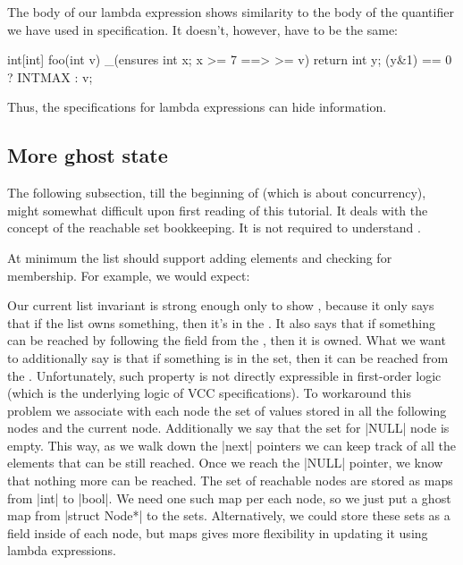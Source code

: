 \begin{note}
The body of our lambda expression shows similarity to the body
of the quantifier we have used in specification.
It doesn't, however, have to be the same:
\begin{VCC}
int[int] foo(int v)
  _(ensures \forall int x; x >= 7 ==> \result[x] >= v)
{
  return \lambda int y; (y&1) == 0 ? INTMAX : v;
}
\end{VCC}
Thus, the specifications for lambda expressions can hide information.
\end{note}


\subsection{More ghost state}

\begin{note}
The following subsection, till the beginning of  (which is
about concurrency), might somewhat difficult upon first reading of this
tutorial.
It deals with the concept of the reachable set bookkeeping.
It is not required to understand .
\end{note}

At minimum the list should support adding elements and checking
for membership. For example, we would expect:


\noindent
Our current list invariant is strong enough only to show
, because it only says
that if the list owns something, then it's in the .
It also says that if something can be reached by following
the  field from the , then it is owned.
What we want to additionally say is that if something is in the 
set, then it can be reached from the .
Unfortunately, such property is not directly expressible in first-order
logic (which is the underlying logic of VCC specifications).
To workaround this problem we associate with each node
the set of values stored in all the following nodes and
the current node.
Additionally we say that the set for \vcc|NULL| node is empty.
This way, as we walk down the \vcc|next| pointers we can keep
track of all the elements that can be still reached.
Once we reach the \vcc|NULL| pointer, we know that nothing
more can be reached.
The set of reachable nodes are stored as maps from
\vcc|int| to \vcc|bool|.
We need one such map per each node, so we just
put a ghost map from \vcc|struct Node*| to the sets.
Alternatively, we could store these sets as a field inside of each node,
but maps gives more flexibility in updating it using lambda expressions.

